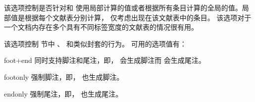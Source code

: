 \begin{optionlist}
该选项控制是否针对和
使用局部计算的值或者根据所有条目计算的全局的值。局部值是根据每个文献表分别计算，
仅考虑出现在该文献表中的条目。
该选项对于一个文档内存在多个具有不同标签宽度的文献表的情况很有用。





该选项控制  节中 、 和类似封套的行为。
可用的选项值有：

\begin{valuelist}
\item[foot+end] %
同时支持脚注和尾注，即， 会生成脚注而  会生成尾注。
\item[footonly] %
强制脚注，即， 也生成脚注。
\item[endonly] %
强制尾注，即， 也生成尾注。
\end{valuelist}



\end{optionlist}
